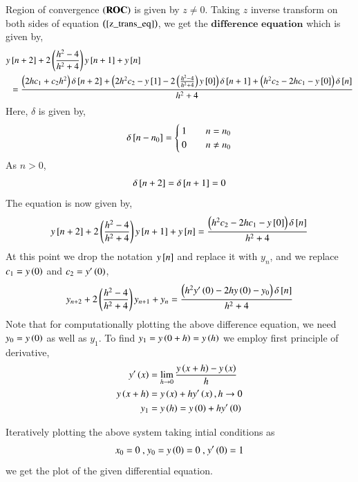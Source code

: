 \documentclass[journal]{IEEEtran}
\begin{document}
Region of convergence $\left(\textbf{ROC}\right)$ is given by $z \neq 0$.
\newline
Taking $z$ inverse transform on both sides of equation $\left(\ref{z_trans_eq}\right)$, we get the $\textbf{difference equation}$ which is given by,
\begin{align}
    y&{}\left[n + 2\right] + 2\left(\frac{h^2 - 4}{h^2 + 4}\right) y{}\left[n + 1\right] + y{}\left[n\right] \nonumber\\
    &= \frac{\left(2h c_1 + c_2 h^2\right)\delta{}\left[n + 2\right] + \left(2h^2 c_2 - y{}\left[1\right] - 2\left(\frac{h^2 - 4}{h^2 + 4}\right)y{}\left[0\right]\right)\delta{}\left[n + 1\right] + \left(h^2c_2 - 2hc_1 - y{}\left[0\right]\right)\delta{}\left[n\right]}{h^2 + 4} \label{diff_eq}
\end{align}
Here, $\delta$ is given by,
\begin{align}
    \delta{}\left[n - n_0\right] =
    \begin{cases}
        1 & \quad n = n_0\\
        0 & \quad n \neq n_0
    \end{cases}
\end{align}
As $n > 0$, 
\begin{align}
    \delta{}\left[n + 2\right] = \delta{}\left[n + 1\right] = 0
\end{align}
The equation \brak{\ref{diff_eq}} is now given by,
\begin{align}
    y{}\left[n + 2\right] + 2\left(\frac{h^2 - 4}{h^2 + 4}\right) y{}\left[n + 1\right] + y{}\left[n\right] = \frac{\left(h^2c_2 - 2hc_1 - y{}\left[0\right]\right)\delta{}\left[n\right]}{h^2 + 4} 
\end{align}
At this point we drop the notation $y{}\left[n\right]$ and replace it with $y_n$, and we replace $c_1 = y\left(0\right)$ and $c_2 = y^{\prime}\left(0\right)$,
\begin{align}
    y_{n + 2} + 2\left(\frac{h^2 - 4}{h^2 + 4}\right) y_{n + 1} + y_{n} = \frac{\left(h^2y^{\prime}\left(0\right) - 2hy\left(0\right) - y_0\right)\delta{}\left[n\right]}{h^2 + 4} 
\end{align}
Note that for computationally plotting the above difference equation, we need $y_0 = y\left(0\right)$ as well as $y_1$. To find $y_1 = y\left(0 + h\right) = y\left(h\right)$ we employ first principle of derivative,
\begin{align}
    y^{\prime}\left(x\right) &= \lim_{h\to0} \frac{y\left(x + h\right) - y\left(x\right)}{h}\\
    y\left(x + h\right) &= y\left(x\right) + hy^{\prime}\left(x\right), h\to0\\
    y_1 &= y\left(h\right) = y\left(0\right) + hy^{\prime}\left(0\right)
\end{align}

Iteratively plotting the above system taking intial conditions as 
\begin{align}
    x_0 = 0 \text{ , } y_{0} = y\left(0\right) = 0 \text{ , } y^{\prime}\left(0\right) = 1
\end{align}
we get the plot of the given differential equation.
\end{document}
